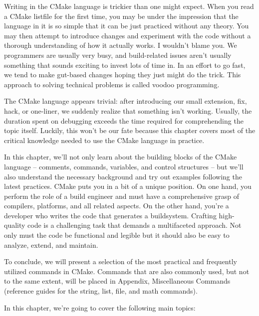 Writing in the CMake language is trickier than one might expect. When you read a CMake listfile for the first time, you may be under the impression that the language in it is so simple that it can be just practiced without any theory. You may then attempt to introduce changes and experiment with the code without a thorough understanding of how it actually works. I wouldn’t blame you. We programmers are usually very busy, and build-related issues aren’t usually something that sounds exciting to invest lots of time in. In an effort to go fast, we tend to make gut-based changes hoping they just might do the trick. This approach to solving technical problems is called voodoo programming.

The CMake language appears trivial: after introducing our small extension, fix, hack, or one-liner, we suddenly realize that something isn’t working. Usually, the duration spent on debugging exceeds the time required for comprehending the topic itself. Luckily, this won’t be our fate because this chapter covers most of the critical knowledge needed to use the CMake language in practice.

In this chapter, we’ll not only learn about the building blocks of the CMake language – comments, commands, variables, and control structures – but we’ll also understand the necessary background and try out examples following the latest practices.
CMake puts you in a bit of a unique position. On one hand, you perform the role of a build engineer and must have a comprehensive grasp of compilers, platforms, and all related aspects. On the other hand, you’re a developer who writes the code that generates a buildsystem. Crafting high-quality code is a challenging task that demands a multifaceted approach. Not only must the code be functional and legible but it should also be easy to analyze, extend, and maintain.

To conclude, we will present a selection of the most practical and frequently utilized commands in CMake. Commands that are also commonly used, but not to the same extent, will be placed in Appendix, Miscellaneous Commands (reference guides for the string, list, file, and math commands).

In this chapter, we’re going to cover the following main topics:

